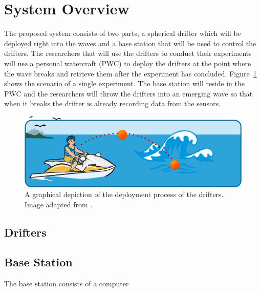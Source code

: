 \section{System Overview}
The proposed system consists of two parts, a spherical drifter which will be deployed right into the waves and a base station that will be used to control the drifters.  The researchers that will use the drifters to conduct their experiments will use a personal watercraft (PWC) to deploy the drifters at the point where the wave breaks and retrieve them after the experiment has concluded. Figure~\ref{fig:systemOverview} shows the scenario of a single experiment.  The base station will reside in the PWC and the researchers will throw the drifters into an emerging wave so that when it breaks the drifter is already recording data from the sensors.

\begin{figure}[H]
	\centering
	\includegraphics[width=\textwidth]{img/systemOverview}
	\caption{A graphical depiction of the deployment process of the drifters. Image adapted from \cite{boaterExam}. \label{fig:systemOverview}}
\end{figure}

\subsection{Drifters}
\subsection{Base Station}
The base station consists of a computer




